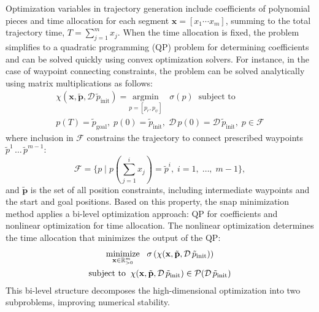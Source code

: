 Optimization variables in trajectory generation include coefficients of polynomial pieces and time allocation for each segment $\mathbf{x} = [x_{1} \cdots x_{m}]$, summing to the total trajectory time, $T = {\textstyle\sum \nolimits}_{j=1}^{m}x_{j}$.
When the time allocation is fixed, the problem simplifies to a quadratic programming (QP) problem for determining coefficients and can be solved quickly using convex optimization solvers.
For instance, in the case of waypoint connecting constraints, the problem can be solved analytically using matrix multiplications as follows:
\begin{equation}\label{eqn:minsnap_1}
\begin{gathered}
\chi(\mathbf{x}, \tilde{\mathbf{ p}}, \mathcal{D\,} \tilde p_{\text{init}}) = \underset{p=[p_r, p_\psi]}{\text{argmin}} \;\;\; \sigma\left(p\right) \;\; \text{subject to}\\
p(T) = \tilde p_{\text{goal}},\; p(0) = \tilde p_{\text{init}},\; \mathcal{D\,} p(0) = \mathcal{D\,} \tilde p_{\text{init}},\; p \in \mathcal{F}
\end{gathered}
\end{equation}
where inclusion in $\mathcal{F}$ constrains the trajectory to connect prescribed waypoints $\tilde p^1\, \dots\, \tilde p^{m-1}$:
\begin{equation}
    \mathcal{F} = \{p\;|\;p({\textstyle\sum \nolimits}_{j=1}^{i}x_{j}) = \tilde{p}^i, \; i=1,\;\dots,\;m-1\},
\end{equation}
and $\tilde{ \mathbf{p}}$ is the set of all position constraints, including intermediate waypoints and the start and goal positions.
Based on this property, the snap minimization method applies a bi-level optimization approach: QP for coefficients and nonlinear optimization for time allocation. 
The nonlinear optimization determines the time allocation that minimizes the output of the QP:
\begin{equation}\label{eqn:minsnap_2}
    \begin{gathered}
\underset{\mathbf{x} \in \mathbb{R}^m_{> 0}}{\text{minimize}} \;\;\; \sigma\left(\chi(\mathbf{x}, \tilde{\mathbf{ p}}, \mathcal{D\,} \tilde p_{\text{init}})\right) \\
\text{subject to}\;\; \chi(\mathbf{x}, \tilde{\mathbf{ p}}, \mathcal{D\,} \tilde p_{\text{init}}) \in \mathcal{P}(\mathcal{D\,} \tilde p_{\text{init}})
\end{gathered}
\end{equation}
This bi-level structure decomposes the high-dimensional optimization into two subproblems, improving numerical stability.

